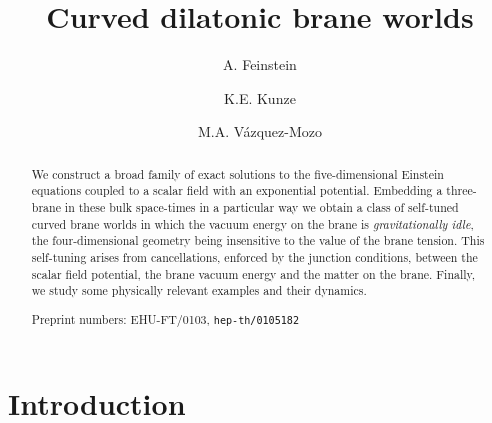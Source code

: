\documentclass[prd,a4paper,twocolumn,superscriptaddress,nofootinbib,showpacs]{revtex4}
\begin{document}
\title[Curved dilatonic brane worlds]{Curved dilatonic brane worlds}


\author{A. Feinstein}
\author{K.E. Kunze}
\author{M.A. V\'azquez-Mozo}




\begin{abstract}

\vspace*{0.6cm}

We construct a broad family of exact solutions to 
the five-dimensional Einstein equations coupled to a scalar field with an exponential potential. 
Embedding a three-brane in these bulk space-times 
in a particular way we obtain a class of self-tuned curved brane worlds in which 
the vacuum energy on the brane is {\it gravitationally idle}, the four-dimensional geometry
being insensitive to the value of the brane tension. This self-tuning arises from cancellations,
enforced by the junction conditions, between the scalar field potential, the brane vacuum energy and the 
matter on the brane. Finally, we study some physically relevant examples and their dynamics. 

\vspace*{0.5cm}

\noindent
{\footnotesize Preprint numbers: EHU-FT/0103, {\tt hep-th/0105182}}

\end{abstract}


\maketitle



\section{Introduction}
\end{document}
